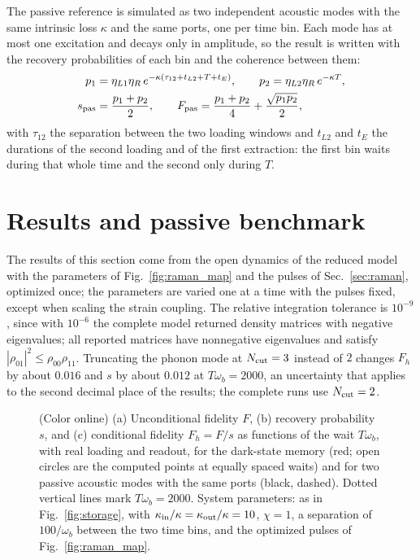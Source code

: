 \documentclass[aps,pra,preprint,groupedaddress,amsmath,amssymb,floatfix]{revtex4-2}
\begin{document}
The passive reference is simulated as two independent acoustic modes with the same intrinsic loss $\kappa$ and the same ports, one per time bin. Each mode has at most one excitation and decays only in amplitude, so the result is written with the recovery probabilities of each bin and the coherence between them:
\begin{align}
p_1&=\eta_{L1}\eta_R\,e^{-\kappa(\tau_{12}+t_{L2}+T+t_E)},\qquad
p_2=\eta_{L2}\eta_R\,e^{-\kappa T},\nonumber\\
s_{\rm pas}&=\frac{p_1+p_2}{2},\qquad
F_{\rm pas}=\frac{p_1+p_2}{4}+\frac{\sqrt{p_1p_2}}{2},\label{eq:passive}
\end{align}
with $\tau_{12}$ the separation between the two loading windows and $t_{L2}$ and $t_E$ the durations of the second loading and of the first extraction: the first bin waits during that whole time and the second only during $T$.

\section{Results and passive benchmark}
\label{sec:results}

The results of this section come from the open dynamics of the reduced model with the parameters of Fig.~\ref{fig:raman_map} and the pulses of Sec.~\ref{sec:raman}, optimized once; the parameters are varied one at a time with the pulses fixed, except when scaling the strain coupling. The relative integration tolerance is $10^{-9}$, since with $10^{-6}$ the complete model returned density matrices with negative eigenvalues; all reported matrices have nonnegative eigenvalues and satisfy $|\rho_{01}|^2\le\rho_{00}\rho_{11}$. Truncating the phonon mode at $N_{\rm cut}=3$ instead of $2$ changes $F_h$ by about $0.016$ and $s$ by about $0.012$ at $T\omega_b=2000$, an uncertainty that applies to the second decimal place of the results; the complete runs use $N_{\rm cut}=2$.

\begin{figure}[h]
\centering
\resizebox{\columnwidth}{!}{}
\caption{(Color online) (a) Unconditional fidelity $F$, (b) recovery probability $s$, and (c) conditional fidelity $F_h=F/s$ as functions of the wait $T\omega_b$, with real loading and readout, for the dark-state memory (red; open circles are the computed points at equally spaced waits) and for two passive acoustic modes with the same ports (black, dashed). Dotted vertical lines mark $T\omega_b=2000$. System parameters: as in Fig.~\ref{fig:storage}, with $\kappa_{\rm in}/\kappa=\kappa_{\rm out}/\kappa=10$, $\chi=1$, a separation of $100/\omega_b$ between the two time bins, and the optimized pulses of Fig.~\ref{fig:raman_map}.}
\label{fig:sweep}
\end{figure}
\end{document}
